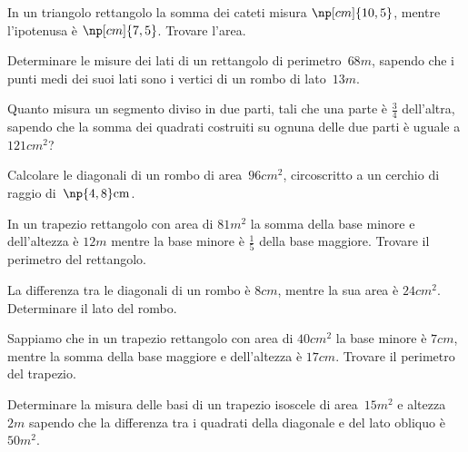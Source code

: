 \begin{multicols}{2}
\begin{esercizio}[\Ast]
 \label{ese:6.86}
In un triangolo rettangolo la somma dei cateti misura $\np[cm]{10,5}$, mentre l'ipotenusa è $\np[cm]{7,5}$. Trovare l'area.
\end{esercizio}

\begin{esercizio}[\Ast]
 \label{ese:6.87}
Determinare le misure dei lati di un rettangolo di perimetro~$68 \unit{m}$, sapendo che i punti medi dei suoi lati sono i vertici di un rombo di lato~$13 \unit{m}$.
\end{esercizio}

\begin{esercizio}[\Ast]
 \label{ese:6.88}
Quanto misura un segmento diviso in due parti, tali che una parte è $ \frac 3 4 $ dell'altra, sapendo che la somma dei quadrati costruiti su ognuna delle due parti è uguale a $121\unit{{cm}^2}$?
\end{esercizio}

\begin{esercizio}[\Ast]
 \label{ese:6.89}
Calcolare le diagonali di un rombo di area~$96 \unit{cm^{2}}$, circoscritto a un cerchio di raggio di~$\np{4,8} \unit{cm}$.
\end{esercizio}

\begin{esercizio}[\Ast]
 \label{ese:6.90}
In un trapezio rettangolo con area di $81\unit{m^2}$ la somma della base minore e dell'altezza è $12\unit{m}$ mentre la base minore è $\frac 1 5$ della base maggiore. Trovare il perimetro del rettangolo.
\end{esercizio}

\begin{esercizio}[\Ast]
 \label{ese:6.91}
La differenza tra le diagonali di un rombo è $8\unit{cm}$, mentre la sua area è $24\unit{{cm}^2}$. Determinare il lato del rombo.
\end{esercizio}

\begin{esercizio}[\Ast]
 \label{ese:6.92}
Sappiamo che in un trapezio rettangolo con area di $40\unit{{cm}^2}$ la base minore è $7\unit{cm}$, mentre la somma della base maggiore e dell'altezza è $17\unit{cm}$. Trovare il perimetro del trapezio.
\end{esercizio}

\begin{esercizio}[\Ast]
 \label{ese:6.93}
Determinare la misura delle basi di un trapezio isoscele di area~$15 \unit{m^{2}}$ e altezza~$2 \unit{m}$ sapendo che la differenza tra i quadrati della diagonale e del lato obliquo è~$50 \unit{m^{2}}$.
\end{esercizio}


\end{multicols}
